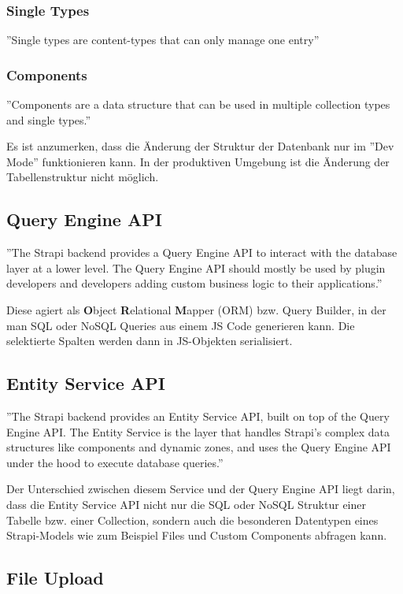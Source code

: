 \subsubsection{Single Types}
\label{single-types}
''Single types are content-types that can only manage one entry''
\cite{collection-types}

\subsubsection*{Components}
''Components are a data structure that can be used in multiple collection types and single types.''
\cite{collection-types}


Es ist anzumerken, dass die Änderung der Struktur der Datenbank nur im ''Dev Mode'' funktionieren kann. In der produktiven Umgebung ist die Änderung der Tabellenstruktur nicht möglich.


\subsection{Query Engine API}
''The Strapi backend provides a Query Engine API to interact with the database layer at a lower level.
The Query Engine API should mostly be used by plugin developers and developers adding custom business logic
to their applications.''
\cite{query-engine-api}

Diese agiert als \textbf{O}bject \textbf{R}elational \textbf{M}apper (ORM) bzw. Query Builder, 
in der man SQL oder NoSQL Queries aus einem JS Code generieren kann. Die selektierte Spalten werden dann in JS-Objekten 
serialisiert.

\subsection{Entity Service API}
''The Strapi backend provides an Entity Service API, built on top of the Query Engine API.
The Entity Service is the layer that handles Strapi's complex data
structures like components and dynamic zones, and uses the Query Engine API
under the hood to execute database queries.''

Der Unterschied zwischen diesem Service und der Query Engine API liegt darin,
dass die Entity Service API nicht nur die SQL oder NoSQL Struktur einer
Tabelle bzw. einer Collection, sondern auch die besonderen Datentypen eines Strapi-Models wie zum Beispiel Files und Custom Components abfragen kann.
\cite{service-engine-api}
\subsection{File Upload}

